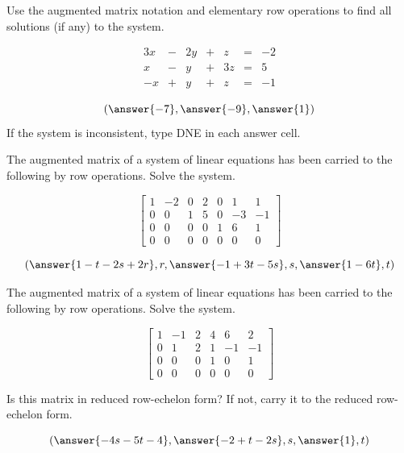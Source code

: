 \documentclass{ximera}
\begin{document}
\begin{exercise}
Use the augmented matrix notation and elementary row operations to find all solutions (if any) to the system. 
 
$$\begin{matrix}
      3x& -&2y&+&z&=&-2\\
      x & -&y&+&3z&= &5\\
      -x&+&y&+&z&=&-1
    \end{matrix}$$
 
 $$(\answer{-7}, \answer{-9}, \answer{1})$$
If the system is inconsistent, type DNE in each answer cell.
\end{exercise}

\begin{exercise}
The augmented matrix of a system of linear equations has been carried to the following by row operations.  Solve the system.
 
$$\left[\begin{array}{cccccc|c}
 1 & -2 & 0 & 2 & 0 & 1 & 1\\
 0 & 0 & 1 & 5 & 0 & -3 & -1\\
 0 & 0 & 0 & 0 & 1 & 6 & 1\\
 0 & 0 & 0 & 0 & 0 & 0 & 0
 \end{array}\right]$$
 
 $$(\answer{1-t-2s+2r}, r, \answer{-1+3t-5s}, s,\answer{1-6t}, t)$$
\end{exercise}

\begin{exercise}
The augmented matrix of a system of linear equations has been carried to the following by row operations.  Solve the system.
 
$$\left[\begin{array}{ccccc|c}
 1 & -1 & 2 & 4 & 6 & 2\\
0 & 1 & 2 & 1 & -1 & -1\\
 0 & 0 & 0 & 1 & 0 & 1\\
 0 & 0 & 0 & 0 & 0 & 0
 \end{array}\right]$$
 
 \begin{hint}
     Is this matrix in reduced row-echelon form?  If not, carry it to the reduced row-echelon form.
 \end{hint}
 
 $$(\answer{-4s-5t-4}, \answer{-2+t-2s}, s,\answer{1}, t)$$
  
\end{exercise}
\end{document}
